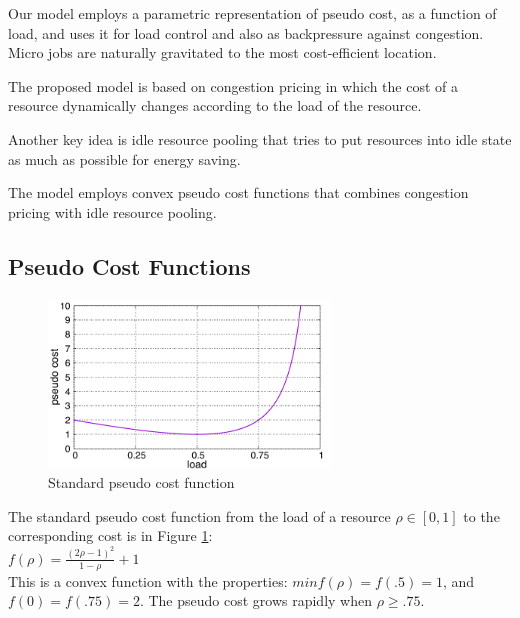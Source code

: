 

Our model employs a parametric representation of pseudo cost, as a
function of load, and uses it for load control and also as
backpressure against congestion.
Micro jobs are naturally gravitated to the most cost-efficient
location.

The proposed model is based on congestion pricing in which the cost of
a resource dynamically changes according to the load of the resource.

Another key idea is idle resource pooling that tries to put resources
into idle state as much as possible for energy saving.

The model employs convex pseudo cost functions that combines congestion
pricing with idle resource pooling.

\subsection{Pseudo Cost Functions}

\begin{figure}[thb]
  \begin{center}
    \includegraphics[width=7.5cm,clip]{costfunc.pdf}
    \vspace{-2.0ex}
    \caption{Standard pseudo cost function}
    \label{fig:std_costfunc}
  \end{center}
\end{figure}

The standard pseudo cost function from the load of a resource
$\rho \in [0, 1]$ to the corresponding cost is in Figure
\ref{fig:std_costfunc}: \\

\( f(\rho) = \frac{(2\rho - 1)^{2}}{1 - \rho} + 1  \) \\

This is a convex function with the properties:
$min f(\rho) = f(.5) = 1$, and $f(0) = f(.75) = 2$.
The pseudo cost grows rapidly when $\rho \ge .75$.

